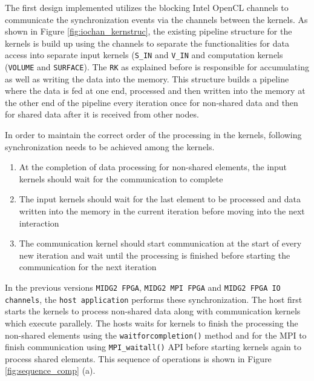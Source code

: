 The first design implemented utilizes the blocking Intel OpenCL channels
to communicate the synchronization events via the channels between the kernels.
As shown in Figure \ref{fig:iochan_kernstruc}, the existing pipeline
structure for the kernels is build up using the channels to separate the functionalities
for data access into separate input kernels (\texttt{S\_IN} and \texttt{V\_IN}
and computation kernels (\texttt{VOLUME} and \texttt{SURFACE}). The \texttt{RK}
as explained before is responsible for accumulating as well as writing the data into
the memory. This structure builds a pipeline where the data is fed at one end,
processed and then written into the memory at the other end of the pipeline every
iteration once for non-shared data and then for shared data after it is received
from other nodes.

In order to maintain the correct order of the processing in the kernels,
following synchronization needs to be achieved among the kernels.

\begin{enumerate}
    \item At the completion of data processing for non-shared elements, the input kernels should wait
    for the communication to complete
    \item The input kernels should wait for the last element to be processed and data written into the memory
    in the current iteration before moving into the next interaction
    \item The communication kernel should start communication at the start of every new iteration and wait
    until the processing is finished before starting the communication for the next iteration
\end{enumerate}

In the previous versions \texttt{MIDG2 FPGA}, \texttt{MIDG2 MPI FPGA} and \texttt{MIDG2 FPGA IO channels},
the \texttt{host application} performs these synchronization. The host first starts the kernels
to process non-shared data along with communication kernels which execute parallely. The hosts waits for
kernels to finish the processing the non-shared elements using the \texttt{waitforcompletion()} method and
for the MPI to finish communication using \texttt{MPI\_waitall()} API before starting
kernels again to process shared elements. This sequence of operations is shown in Figure
\ref{fig:sequence_comp} (a).

